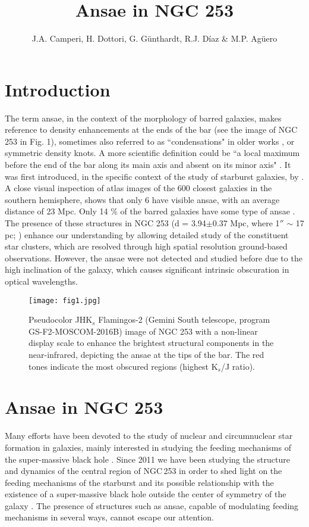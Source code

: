 \documentclass[baaa]{baaa}
\title{Ansae in NGC 253}
\author{
J.A. Camperi\inst{1},
H. Dottori\inst{4},
G. Günthardt\inst{1},
R.J. Díaz\inst{1,3}
\&
M.P. Agüero\inst{1,2}
}
\institute{
Observatorio Astron\'omico de C\'ordoba, UNC, Argentina 
\and
Consejo Nacional de Investigaciones Cient{\'\i}ficas y T\'ecnicas, Argentina
\and
Gemini Observatory, EE.UU.
\and 
Instituto de Física, Universidade Federal do Rio Grande do Sul, Brasil
}
\begin{document}
\maketitle
\section{Introduction}\label{S_intro}

The term ansae, in the context of the morphology of barred galaxies, makes reference to density enhancements at the ends of the bar (see the image of NGC 253 in Fig. 1), sometimes also referred to as ``condensations" in older works \citep{1965AJ.....70..501D}, or symmetric density knots. A more scientific definition could be ``a local maximum before the end of the bar along its main axis and absent on its minor axis" \citep{2007AJ....134.1863M}. It was first introduced, in the specific context of the study of starburst galaxies, by \citet{1995AJ....110.1588B}. A close visual inspection of atlas images of the 600 closest galaxies in the southern hemisphere, shows that only 6 have visible ansae, with an average distance of 23 Mpc. Only 14 \% of the barred galaxies have some type of ansae \citep{2007AJ....134.1863M}. The presence of these structures in NGC 253 (d = 3.94$\pm$0.37 Mpc, where 1$''$ $\sim$ 17 pc; \citealt{2003A&A...404...93K}) enhance our understanding by allowing detailed study of the constituent star clusters, which are resolved through high spatial resolution ground-based observations. However, the ansae were not detected and studied before due to the high inclination of the galaxy, which causes significant intrinsic obscuration in optical wavelengths.

\begin{figure}[!t]
\centering
\texttt{[image: fig1.jpg]}
\caption{Pseudocolor JHK$_{s}$ Flamingos-2 (Gemini South telescope, program GS-F2-MOSCOM-2016B) image of NGC 253 with a non-linear display scale to enhance the brightest structural components in the near-infrared, depicting the ansae at the tips of the bar. The red tones indicate the most obscured regions (highest K$_{s}$/J ratio).}
\label{Figura}
\end{figure}

\section{Ansae in NGC 253}

Many efforts have been devoted to the study of nuclear and circumnuclear star formation in galaxies, mainly interested in studying the feeding mechanisms of the super-massive black hole \citep[e.g.][]{2014ApJ...780...86E,2016IJAA....6..219A,2016MNRAS.461.4192R}. 
Since 2011 we have been studying the structure and dynamics of the central region of NGC\,253 in order to shed light on the feeding mechanisms of the starburst and its possible relationship with the existence of a super-massive black hole outside the center of symmetry of the galaxy \citep{2012BAAA...55..253C,2015BAAA...57...28C}.
The presence of structures such as ansae, capable of modulating feeding mechanisms in several ways, cannot escape  our attention.
\end{document}
